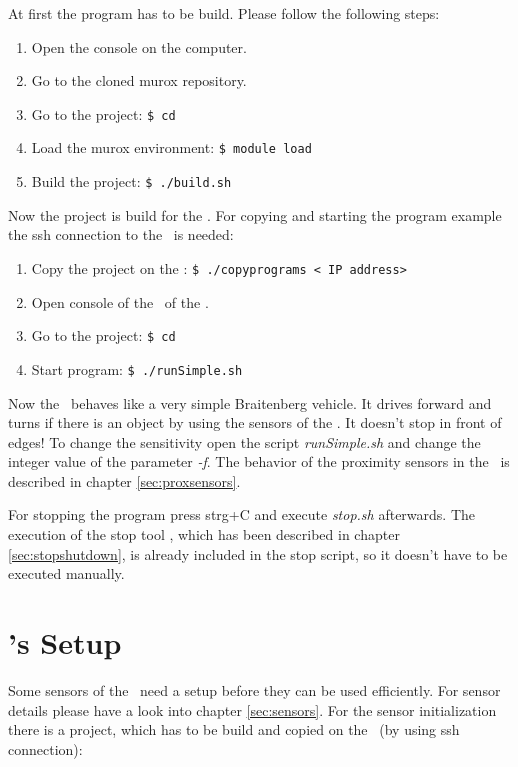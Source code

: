 At first the program has to be build. Please follow the following steps:

\begin{enumerate}
\item Open the console on the computer.
\item Go to the cloned murox repository.
\item Go to the project: {\tt\$ cd \demopath\testname}
\item Load the murox environment: {\tt\$ module load \modulemurox}
\item Build the project: {\tt\$ ./build.sh}
\end{enumerate}

Now the project is build for the \amiro. For copying and starting the program example the ssh connection to the \amiro\ is needed:

\begin{enumerate}
\item Copy the project on the \amiro: {\tt\$ ./copyprograms <\amiro\ IP address>}
\item Open console of the \cognition\ of the \amiro.
\item Go to the project: {\tt\$ cd \amirohomepath\testname}
\item Start program: {\tt\$ ./runSimple.sh}
\end{enumerate}

Now the \amiro\ behaves like a very simple Braitenberg vehicle. It drives forward and turns if there is an object by using the sensors of the \proxring. It doesn't stop in front of edges! To change the sensitivity open the script {\it runSimple.sh} and change the integer value of the parameter {\it -f}. The behavior of the proximity sensors in the \proxring\ is described in chapter \ref{sec:proxsensors}.

For stopping the program press strg+C and execute {\it stop.sh} afterwards. The execution of the stop tool \stopnameI, which has been described in chapter \ref{sec:stopshutdown}, is already included in the stop script, so it doesn't have to be executed manually.

\chapter{\amiro's Setup}
\label{sec:amirosetup}

Some sensors of the \amiro\ need a setup before they can be used efficiently. For sensor details please have a look into chapter \ref{sec:sensors}. For the sensor initialization there is a project, which has to be build and copied on the \amiro\ (by using ssh connection):

